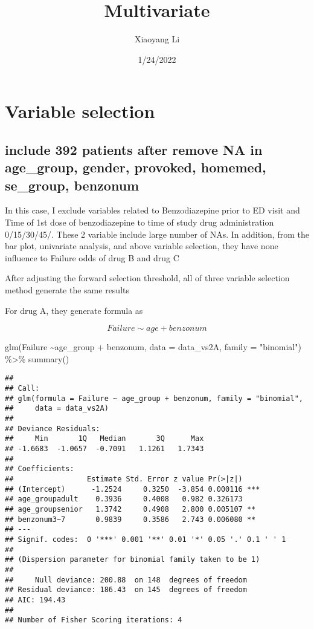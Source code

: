 \documentclass[
]{article}
\title{Multivariate}
\author{Xiaoyang Li}
\date{1/24/2022}
\newenvironment{Shaded}{\begin{snugshade}}{\end{snugshade}}
\newcommand{\AttributeTok}[1]{\textcolor[rgb]{0.77,0.63,0.00}{#1}}
\newcommand{\FunctionTok}[1]{\textcolor[rgb]{0.00,0.00,0.00}{#1}}
\newcommand{\NormalTok}[1]{#1}
\newcommand{\SpecialCharTok}[1]{\textcolor[rgb]{0.00,0.00,0.00}{#1}}
\newcommand{\StringTok}[1]{\textcolor[rgb]{0.31,0.60,0.02}{#1}}
\begin{document}
\maketitle

\hypertarget{variable-selection}{%
\section{Variable selection}\label{variable-selection}}

\hypertarget{include-392-patients-after-remove-na-in-age_group-gender-provoked-homemed-se_group-benzonum}{%
\subsection{include 392 patients after remove NA in age\_group, gender,
provoked, homemed, se\_group,
benzonum}\label{include-392-patients-after-remove-na-in-age_group-gender-provoked-homemed-se_group-benzonum}}

In this case, I exclude variables related to Benzodiazepine prior to ED
visit and Time of 1st dose of benzodiazepine to time of study drug
administration 0/15/30/45/. These 2 variable include large number of
NAs. In addition, from the bar plot, univariate analysis, and above
variable selection, they have none influence to Failure odds of drug B
and drug C

After adjusting the forward selection threshold, all of three variable
selection method generate the same results

For drug A, they generate formula as

\[Failure \sim age +benzonum\]

\begin{Shaded}
\begin{Highlighting}[]
\FunctionTok{glm}\NormalTok{(Failure }\SpecialCharTok{\textasciitilde{}}\NormalTok{age\_group }\SpecialCharTok{+}\NormalTok{ benzonum, }\AttributeTok{data =}\NormalTok{ data\_vs2A, }\AttributeTok{family =} \StringTok{"binomial"}\NormalTok{) }\SpecialCharTok{\%\textgreater{}\%} \FunctionTok{summary}\NormalTok{()}
\end{Highlighting}
\end{Shaded}

\begin{verbatim}
## 
## Call:
## glm(formula = Failure ~ age_group + benzonum, family = "binomial", 
##     data = data_vs2A)
## 
## Deviance Residuals: 
##     Min       1Q   Median       3Q      Max  
## -1.6683  -1.0657  -0.7091   1.1261   1.7343  
## 
## Coefficients:
##                 Estimate Std. Error z value Pr(>|z|)    
## (Intercept)      -1.2524     0.3250  -3.854 0.000116 ***
## age_groupadult    0.3936     0.4008   0.982 0.326173    
## age_groupsenior   1.3742     0.4908   2.800 0.005107 ** 
## benzonum3~7       0.9839     0.3586   2.743 0.006080 ** 
## ---
## Signif. codes:  0 '***' 0.001 '**' 0.01 '*' 0.05 '.' 0.1 ' ' 1
## 
## (Dispersion parameter for binomial family taken to be 1)
## 
##     Null deviance: 200.88  on 148  degrees of freedom
## Residual deviance: 186.43  on 145  degrees of freedom
## AIC: 194.43
## 
## Number of Fisher Scoring iterations: 4
\end{verbatim}
\end{document}
